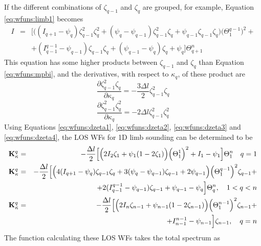  If the different combinations of $\zeta_{q-1}$ and $\zeta_q$ are 
 grouped, for example, Equation \ref{eq:wfuns:limb1} becomes
 \begin{eqnarray}
   I & = & \Big[\Big((I_{q+1}-\psi_q)\zeta_{q-1}^2\zeta_q^2+(\psi_q-\psi_{q-1})
            \zeta_{q-1}^2\zeta_q + \psi_{q-1}\zeta_{q-1}\zeta_q
            \Big)\Big(\Theta^{q-1}_{1}\Big)^2 + \nonumber \\
    &  &     + (I_{q-1}^{q-1}-\psi_{q-1})\zeta_{q-1}\zeta_q + 
            (\psi_{q-1}-\psi_q)\zeta_q + \psi_q \Big] \Theta^n_{q+1} 
 \end{eqnarray}
 This equation has some higher products between
 $\zeta_{q-1}$ and $\zeta_q$ than Equation \ref{eq:wfuns:mpbi}, and
 the derivatives, with respect to $\kappa_q$, of these product are
 \begin{equation}
   \frac{\partial \zeta_{q-1}^2\zeta_q}{\partial \kappa_q} = 
         -\frac{3\Delta l}{2} \zeta_{q-1}^2\zeta_q
  \label{eq:wfuns:dzeta3}
 \end{equation}
 \begin{equation}
   \frac{\partial \zeta_{q-1}^2\zeta_q^2}{\partial \kappa_q} = 
          -2\Delta l \zeta_{q-1}^2\zeta_q^2
  \label{eq:wfuns:dzeta4}
 \end{equation}
 Using Equations \ref{eq:wfuns:dzeta1}, \ref{eq:wfuns:dzeta2},
 \ref{eq:wfuns:dzeta3} and \ref{eq:wfuns:dzeta4}, the LOS WFs for 1D
 limb sounding can be determined to be
 \begin{eqnarray}
   \mathbf{K}_{\kappa}^q& = & -\frac{\Delta l}{2}\Big[ \Big( 2I_2\zeta_1+\psi_1(1-
       2\zeta_1)\Big) \Big(\Theta^1_1\Big)^2 +I_1-\psi_1 \Big]\Theta^n_1
          \quad q=1 \nonumber \\
   \mathbf{K}_{\kappa}^q& = & -\frac{\Delta l}{2}\Big[\Big(4(I_{q+1}-\psi_q)
           \zeta_{q-1}\zeta_q+
            3(\psi_q-\psi_{q-1})\zeta_{q-1} + 2 \psi_{q-1}
            \Big) \Big(\Theta^{q-1}_{1}\Big)^2\zeta_{q-1} +  \nonumber \\
       &  & + 2(I_{q-1}^{q-1}-\psi_{q-1})\zeta_{q-1} + 
            \psi_{q-1}-\psi_q \Big] \Theta^n_{q}, \quad 1<q<n
  \label{eq:wfuns:loswfs2} \\
   \mathbf{K}_{\kappa}^q& = & -\frac{\Delta l}{2}\Big[\Big( 2I_n\zeta_{n-1}+
         \psi_{n-1}(1-2\zeta_{n-1}) \Big)\Big(\Theta^{n-1}_{1}\Big)^2\zeta_{n-1}+ 
             \nonumber \\   
       & &  + I_{n-1}^{n-1}-\psi_{n-1}\Big] \zeta_{n-1}, \quad q=n \nonumber
 \end{eqnarray}
 The function calculating these LOS WFs takes the total spectrum as

